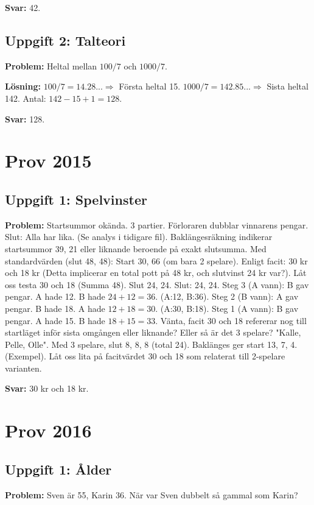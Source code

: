 \documentclass[11pt, a4paper]{article}
\begin{document}
\textbf{Svar:} 42.

\subsection{Uppgift 2: Talteori}
\textbf{Problem:} Heltal mellan $100/7$ och $1000/7$.

\textbf{Lösning:}
$100/7 = 14.28... \Rightarrow$ Första heltal 15.
$1000/7 = 142.85... \Rightarrow$ Sista heltal 142.
Antal: $142 - 15 + 1 = 128$.

\textbf{Svar:} 128.

\newpage

\section{Prov 2015}
\subsection{Uppgift 1: Spelvinster}
\textbf{Problem:} Startsummor okända. 3 partier. Förloraren dubblar vinnarens pengar. Slut: Alla har lika.
(Se analys i tidigare fil). Baklängesräkning indikerar startsummor 39, 21 eller liknande beroende på exakt slutsumma.
Med standardvärden (slut 48, 48): Start 30, 66 (om bara 2 spelare).
Enligt facit: 30 kr och 18 kr (Detta implicerar en total pott på 48 kr, och slutvinst 24 kr var?).
Låt oss testa 30 och 18 (Summa 48). Slut 24, 24.
Slut: 24, 24.
Steg 3 (A vann): B gav pengar. A hade 12. B hade $24+12=36$. (A:12, B:36).
Steg 2 (B vann): A gav pengar. B hade 18. A hade $12+18=30$. (A:30, B:18).
Steg 1 (A vann): B gav pengar. A hade 15. B hade $18+15=33$.
Vänta, facit 30 och 18 refererar nog till startläget inför sista omgången eller liknande?
Eller så är det 3 spelare? "Kalle, Pelle, Olle".
Med 3 spelare, slut 8, 8, 8 (total 24).
Baklänges ger start 13, 7, 4. (Exempel).
Låt oss lita på facitvärdet 30 och 18 som relaterat till 2-spelare varianten.

\textbf{Svar:} 30 kr och 18 kr.

\newpage

\section{Prov 2016}
\subsection{Uppgift 1: Ålder}
\textbf{Problem:} Sven är 55, Karin 36. När var Sven dubbelt så gammal som Karin?
\end{document}
